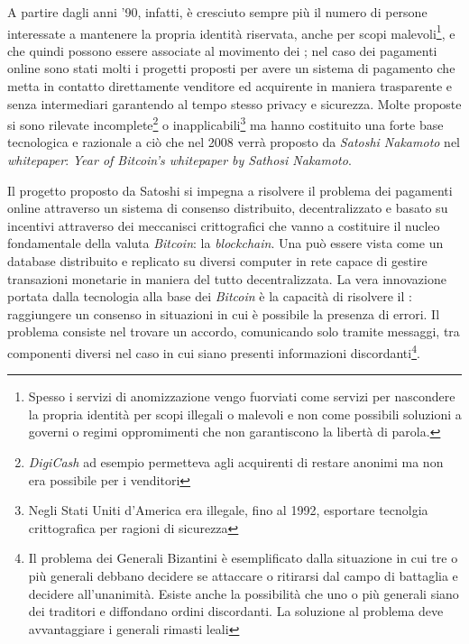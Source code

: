 A partire dagli anni '90, infatti, è cresciuto sempre più il numero di persone interessate a mantenere la propria identità riservata, anche per scopi malevoli\footnote{Spesso i servizi di anomizzazione vengo fuorviati come servizi per nascondere la propria identità per scopi illegali o malevoli e non come possibili soluzioni a governi o regimi oppromimenti che non garantiscono la libertà di parola.}, e che quindi possono essere associate al movimento dei ; nel caso dei pagamenti online sono stati molti i progetti proposti per avere un sistema di pagamento che metta in contatto direttamente venditore ed acquirente in maniera trasparente e senza intermediari garantendo al tempo stesso privacy e sicurezza. Molte proposte si sono rilevate incomplete\footnote{\textit{DigiCash} ad esempio permetteva agli acquirenti di restare anonimi ma non era possibile per i venditori} o inapplicabili\footnote{Negli Stati Uniti d'America era illegale, fino al 1992, esportare tecnolgia crittografica per ragioni di sicurezza} ma hanno costituito una forte base tecnologica e razionale a ciò che nel 2008 verrà proposto da \textit{Satoshi Nakamoto} nel \textit{whitepaper}: \textit{Year of Bitcoin's whitepaper by Sathosi Nakamoto}.\newline

Il progetto proposto da Satoshi si impegna a risolvere il problema dei pagamenti online attraverso un sistema di consenso distribuito, decentralizzato e basato su incentivi attraverso dei meccanisci crittografici che vanno a costituire il nucleo fondamentale della valuta \textit{Bitcoin}: la \textit{blockchain}.\newline
Una  può essere vista come un database distribuito e replicato su diversi computer in rete capace di gestire transazioni monetarie in maniera del tutto decentralizzata.\newline
La vera innovazione portata dalla tecnologia alla base dei \textit{Bitcoin} è la capacità di risolvere il : raggiungere un consenso in situazioni in cui è possibile la presenza di errori. Il problema consiste nel trovare un accordo, comunicando solo tramite messaggi, tra componenti diversi nel caso in cui siano presenti informazioni discordanti\footnote{Il problema dei Generali Bizantini è esemplificato dalla situazione in cui tre o più generali debbano decidere se attaccare o ritirarsi dal campo di battaglia e decidere all'unanimità. Esiste anche la possibilità che uno o più generali siano dei traditori e diffondano ordini discordanti. La soluzione al problema deve avvantaggiare i generali rimasti leali}.\newline

